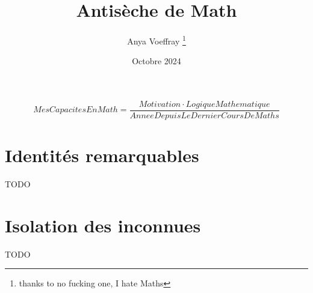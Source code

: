 \documentclass{article}
\title{Antisèche de Math}
\author{Anya Voeffray \thanks{thanks to no fucking one, I hate Maths}}
\date{Octobre 2024}
\begin{document}
	
	
\begin{titlepage}
	
	\maketitle
	
	\begin{equation}
		Mes Capacites En Math =  \frac{Motivation \cdot LogiqueMathematique}{Annee Depuis Le Dernier Cours De Maths}
	\end{equation}
	
\end{titlepage}

\section{Identités remarquables}

TODO

\section{Isolation des inconnues}

TODO
	
\end{document}
